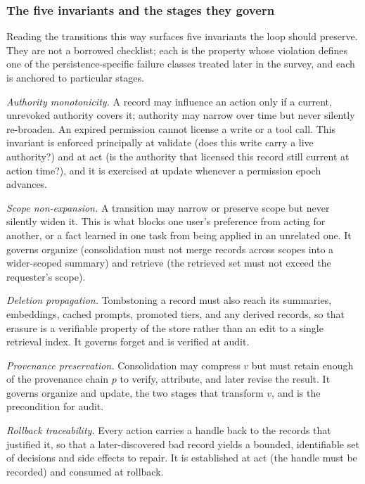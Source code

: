 \subsubsection{The five invariants and the stages they govern}

Reading the transitions this way surfaces five invariants the loop should preserve. They are not a borrowed checklist; each is the property whose violation defines one of the persistence-specific failure classes treated later in the survey, and each is anchored to particular stages.

\emph{Authority monotonicity.} A record may influence an action only if a current, unrevoked authority covers it; authority may narrow over time but never silently re-broaden. An expired permission cannot license a write or a tool call. This invariant is enforced principally at validate (does this write carry a live authority?) and at act (is the authority that licensed this record still current at action time?), and it is exercised at update whenever a permission epoch advances.

\emph{Scope non-expansion.} A transition may narrow or preserve scope but never silently widen it. This is what blocks one user's preference from acting for another, or a fact learned in one task from being applied in an unrelated one. It governs organize (consolidation must not merge records across scopes into a wider-scoped summary) and retrieve (the retrieved set must not exceed the requester's scope).

\emph{Deletion propagation.} Tombstoning a record must also reach its summaries, embeddings, cached prompts, promoted tiers, and any derived records, so that erasure is a verifiable property of the store rather than an edit to a single retrieval index. It governs forget and is verified at audit.

\emph{Provenance preservation.} Consolidation may compress $v$ but must retain enough of the provenance chain $p$ to verify, attribute, and later revise the result. It governs organize and update, the two stages that transform $v$, and is the precondition for audit.

\emph{Rollback traceability.} Every action carries a handle back to the records that justified it, so that a later-discovered bad record yields a bounded, identifiable set of decisions and side effects to repair. It is established at act (the handle must be recorded) and consumed at rollback.

